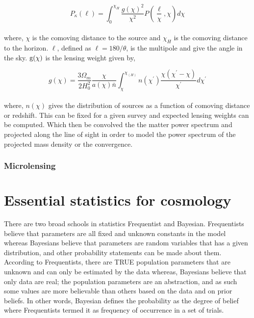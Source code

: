 \begin{equation}
	P_{\kappa}(\ell) = \int_0^{\chi_H} \dfrac{g(\chi)^2}{\chi^2} P(\dfrac{\ell}{\chi},\chi) d\chi
\end{equation}
\\
where,
$\chi$ is the comoving distance to the source and $\chi_{H}$ is the comoving distance to the
horizon. $\ell$, defined as $\ell = 180/\theta$, is the multipole and give the angle in the sky. 
${\rm g}(\chi)$ is the lensing weight given by,

\begin{equation}
	g(\chi) = \dfrac{3\Omega_m}{2H_0^2} \dfrac{\chi}{a(\chi)\bar{n}} \int_{\chi}^{\chi_(H)}
					n(\chi^{\prime}) \dfrac{\chi(\chi^{\prime}-\chi)}{\chi^{\prime}}d\chi^{\prime}
\end{equation}
\\
where, $n(\chi)$ gives the distribution of sources as a function of comoving distance or redshift.
This can be fixed for a given survey and expected lensing weights can be computed. Which then
be convolved the the matter power spectrum and projected along the line of sight in order
to model the power spectrum of the projected mass density or the convergence. 

\subsubsection{Microlensing}



\clearpage
\section{Essential statistics for cosmology}
There are two broad schools in statistics Frequentist and Bayesian. Frequentists believe
that parameters are all fixed and unknown constants in the model whereas Bayesians
believe that parameters are random variables that has a given distribution, and other probability
statements can be made about them. According to Frequentists, there are TRUE
population parameters that are unknown and can only be estimated by the data whereas,
Bayesians believe that only data are real; the population parameters are an abstraction, and
as such some values are more believable than others based on the data and on prior beliefs.
In other words, Bayesian defines the probability as the degree of belief where Frequentists
termed it as frequency of occurrence in a set of trials. 

